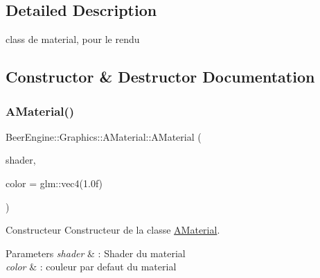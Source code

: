 \subsection{Detailed Description}
class de material, pour le rendu 

\subsection{Constructor \& Destructor Documentation}
\mbox{\label{class_beer_engine_1_1_graphics_1_1_a_material_a1bc44d62a29a702f65757cc12f8d8c07}} 
\subsubsection{\texorpdfstring{A\+Material()}{AMaterial()}}
{\footnotesize\ttfamily Beer\+Engine\+::\+Graphics\+::\+A\+Material\+::\+A\+Material (\begin{DoxyParamCaption}\item[{\mbox{\hyperlink{class_beer_engine_1_1_graphics_1_1_shader_program}{Shader\+Program}} $\ast$}]{shader,  }\item[{glm\+::vec4}]{color = {\ttfamily glm\+:\+:vec4(1.0f)} }\end{DoxyParamCaption})}



Constructeur Constructeur de la classe \mbox{\hyperlink{class_beer_engine_1_1_graphics_1_1_a_material}{A\+Material}}. 


\begin{DoxyParams}{Parameters}
{\em shader} & \+: Shader du material \\
\hline
{\em color} & \+: couleur par defaut du material \\
\hline
\end{DoxyParams}
\mbox{\label{class_beer_engine_1_1_graphics_1_1_a_material_af2e6f86707ff598c6b22f630fea027fb}} 
